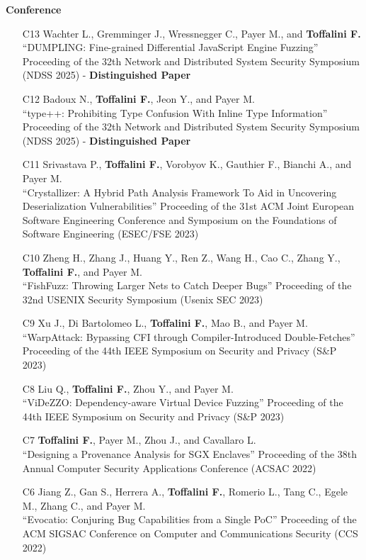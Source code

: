 \textbf{Conference}\begin{enumerate}[leftmargin=5mm]
\item[C13] Wachter L., Gremminger J., Wressnegger C., Payer M., and \textbf{Toffalini F.}\\``DUMPLING: Fine-grained Differential JavaScript Engine Fuzzing'' Proceeding of the 32th Network and Distributed System Security Symposium (NDSS 2025)  - \textbf{Distinguished Paper}
\item[C12] Badoux N., \textbf{Toffalini F.}, Jeon Y., and Payer M.\\``type++: Prohibiting Type Confusion With Inline Type Information'' Proceeding of the 32th Network and Distributed System Security Symposium (NDSS 2025)  - \textbf{Distinguished Paper}
\item[C11] Srivastava P., \textbf{Toffalini F.}, Vorobyov K., Gauthier F., Bianchi A., and Payer M.\\``Crystallizer: A Hybrid Path Analysis Framework To Aid in Uncovering Deserialization Vulnerabilities'' Proceeding of the 31st ACM Joint European Software Engineering Conference and Symposium on the Foundations of Software Engineering (ESEC/FSE 2023) 
\item[C10] Zheng H., Zhang J., Huang Y., Ren Z., Wang H., Cao C., Zhang Y., \textbf{Toffalini F.}, and Payer M.\\``FishFuzz: Throwing Larger Nets to Catch Deeper Bugs'' Proceeding of the 32nd USENIX Security Symposium (Usenix SEC 2023) 
\item[C9] Xu J., Di Bartolomeo L., \textbf{Toffalini F.}, Mao B., and Payer M.\\``WarpAttack: Bypassing CFI through Compiler-Introduced Double-Fetches'' Proceeding of the 44th IEEE Symposium on Security and Privacy (S\&P 2023) 
\item[C8] Liu Q., \textbf{Toffalini F.}, Zhou Y., and Payer M.\\``ViDeZZO: Dependency-aware Virtual Device Fuzzing'' Proceeding of the 44th IEEE Symposium on Security and Privacy (S\&P 2023) 
\item[C7] \textbf{Toffalini F.}, Payer M., Zhou J., and Cavallaro L.\\``Designing a Provenance Analysis for SGX Enclaves'' Proceeding of the 38th Annual Computer Security Applications Conference (ACSAC 2022) 
\item[C6] Jiang Z., Gan S., Herrera A., \textbf{Toffalini F.}, Romerio L., Tang C., Egele M., Zhang C., and Payer M.\\``Evocatio: Conjuring Bug Capabilities from a Single PoC'' Proceeding of the ACM SIGSAC Conference on Computer and Communications Security (CCS 2022) 

\end{enumerate}

